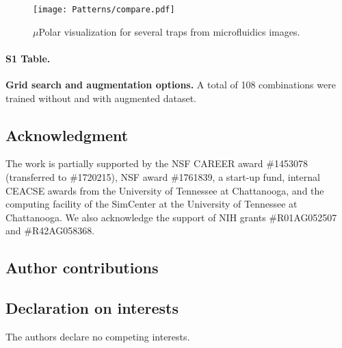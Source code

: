 \documentclass[conference]{IEEEtran}
\begin{document}
\begin{figure}
\centering
\texttt{[image: Patterns/compare.pdf]}
\caption{  $\mu$Polar visualization for several traps from microfluidics images.}
\label{fig:compare}
\end{figure}







\paragraph*{S1 Table.}


\label{S1_Table}
{\bf Grid search and augmentation options.} A total of 108 combinations were trained without and with augmented dataset. 


\subsection*{Acknowledgment}

The work is partially supported by the NSF CAREER award \#1453078 (transferred to \#1720215), NSF award \#1761839, a  start-up fund, internal CEACSE awards from the University of Tennessee at Chattanooga, and the computing facility of the SimCenter at the University of Tennessee at Chattanooga. We also acknowledge the support of NIH grants \#R01AG052507 and \#R42AG058368.


\subsection*{Author contributions}


\subsection*{Declaration on interests}

The authors declare no competing interests.  
\end{document}
